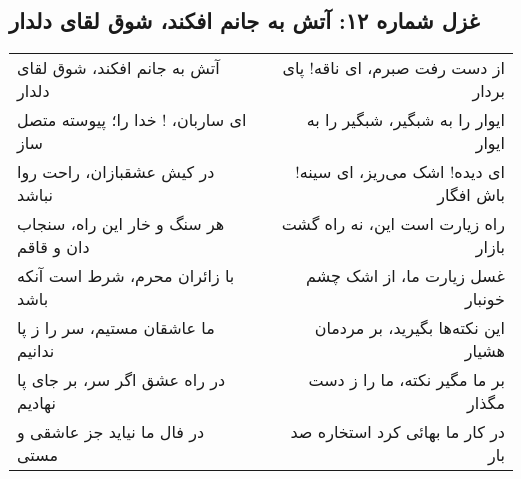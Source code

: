 \begin{center}
\section*{غزل شماره ۱۲: آتش به جانم افکند، شوق لقای دلدار}
\label{sec:012}
\begin{longtable}{l p{0.5cm} r}
آتش به جانم افکند، شوق لقای دلدار
&&
از دست رفت صبرم، ای ناقه! پای بردار
\\
ای ساربان، ! خدا را؛ پیوسته متصل ساز
&&
ایوار را به شبگیر، شبگیر را به ایوار
\\
در کیش عشقبازان، راحت روا نباشد
&&
ای دیده! اشک می‌ریز، ای سینه! باش افگار
\\
هر سنگ و خار این راه، سنجاب دان و قاقم
&&
راه زیارت است این، نه راه گشت بازار
\\
با زائران محرم، شرط است آنکه باشد
&&
غسل زیارت ما، از اشک چشم خونبار
\\
ما عاشقان مستیم، سر را ز پا ندانیم
&&
این نکته‌ها بگیرید، بر مردمان هشیار
\\
در راه عشق اگر سر، بر جای پا نهادیم
&&
بر ما مگیر نکته، ما را ز دست مگذار
\\
در فال ما نیاید جز عاشقی و مستی
&&
در کار ما بهائی کرد استخاره صد بار
\\
\end{longtable}
\end{center}
